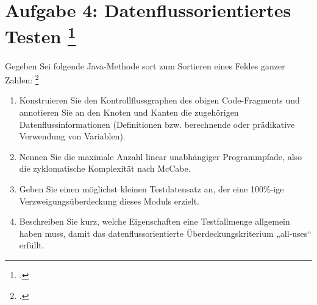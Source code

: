 \documentclass{lehramt-informatik-minimal}
\begin{document}
\section{Aufgabe 4: Datenflussorientiertes Testen
\footcite{sosy:ab:7}}

Gegeben Sei folgende Java-Methode sort zum Sortieren eines Feldes ganzer
Zahlen:
\footcite[Thema 1 Teilaufgabe 2 Aufgabe 3]{examen:66116:2016:09}


\begin{enumerate}


\item Konstruieren Sie den
Kontrollflussgraphen
des obigen Code-Fragments und annotieren Sie an den Knoten und Kanten
die zugehörigen Datenflussinformationen (Definitionen bzw. berechnende
oder prädikative Verwendung von Variablen).


\item Nennen Sie die maximale Anzahl linear unabhängiger Programmpfade,
also die zyklomatische Komplexität nach McCabe.


\item Geben Sie einen möglichst kleinen Testdatensatz an, der eine
100\%-ige Verzweigungsüberdeckung dieses Moduls erzielt.


\item Beschreiben Sie kurz, welche Eigenschaften eine Testfallmenge
allgemein haben muss, damit das datenflussorientierte
Überdeckungskriterium „all-uses“ erfüllt.

\end{enumerate}
\end{document}

